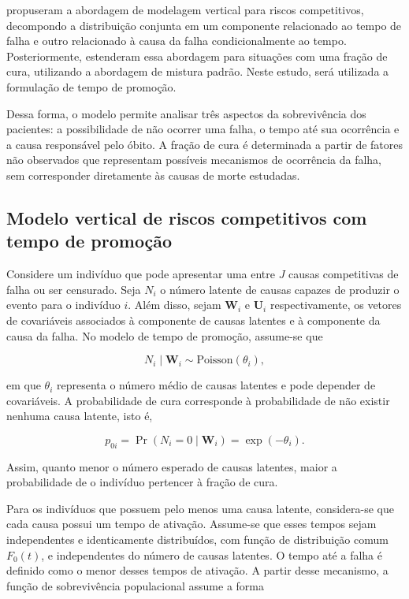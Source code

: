 \documentclass[11pt,a4paper]{article}
\newcommand{\Prb}{\operatorname{Pr}}
\begin{document}
\cite{nicolaie2010vertical} propuseram a abordagem de modelagem vertical para riscos competitivos, decompondo a distribuição conjunta em um componente relacionado ao tempo de falha e outro relacionado à causa da falha condicionalmente ao tempo. Posteriormente, \cite{Nicolaie2019} estenderam essa abordagem para situações com uma fração de cura, utilizando a abordagem de mistura padrão. Neste estudo, será utilizada a formulação de tempo de promoção.

Dessa forma, o modelo permite analisar três aspectos da sobrevivência dos pacientes: a possibilidade de não ocorrer uma falha, o tempo até sua ocorrência e a causa responsável pelo óbito. A fração de cura é determinada a partir de fatores não observados que representam possíveis mecanismos de ocorrência da falha, sem corresponder diretamente às causas de morte estudadas.



\subsection{Modelo vertical de riscos competitivos com tempo de promoção}

Considere um indivíduo que pode apresentar uma entre $J$ causas competitivas de falha ou ser censurado. Seja $N_i$ o número latente de causas capazes de produzir o evento para o indivíduo $i$. Além disso, sejam $\bm W_i$ e $\bm U_i$ respectivamente, os vetores de covariáveis associados à componente de causas latentes e à componente da causa da falha. No modelo de tempo de promoção, assume-se que

$$
N_i\mid \bm W_i \sim \text{Poisson}(\theta_i),
$$

\noindent em que $\theta_i$ representa o número médio de causas latentes e pode depender de covariáveis. A probabilidade de cura corresponde à probabilidade de não existir nenhuma causa latente, isto é,

$$
p_{0i}=\Prb(N_i=0\mid\bm W_i)=\exp(-\theta_i).
$$

Assim, quanto menor o número esperado de causas latentes, maior a probabilidade de o indivíduo pertencer à fração de cura.

Para os indivíduos que possuem pelo menos uma causa latente, considera-se que cada causa possui um tempo de ativação. Assume-se que esses tempos sejam independentes e identicamente distribuídos, com função de distribuição comum \(F_0(t)\), e independentes do número de causas latentes. O tempo até a falha é definido como o menor desses tempos de ativação. A partir desse mecanismo, a função de sobrevivência populacional assume a forma
\end{document}
